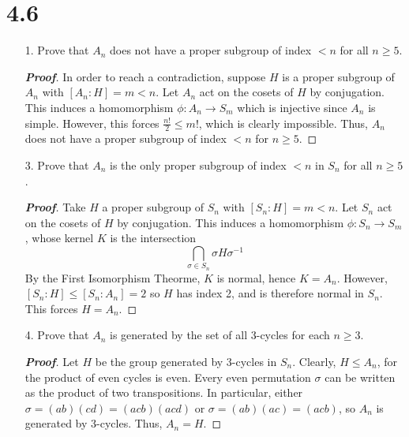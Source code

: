 \documentclass[12pt,leqno]{book}
\theoremstyle{definition}
\newenvironment{Proof}{\begin{proof}[\textnormal{\textbf{Proof}}]}{\end{proof}}
\begin{document}
\section*{4.6}
\begin{enumerate}
 \item [1.] Prove that $A_n$ does not have a proper subgroup of index $<n$ for all $n\geq5$.

\begin{Proof}
 In order to reach a contradiction, suppose $H$ is a proper subgroup of $A_n$ with $[A_n:H]=m<n$. Let $A_n$ act on the cosets of $H$ by conjugation. This induces a homomorphism $\phi:A_n\to S_m$ which is injective since $A_n$ is simple. However, this forces $\frac{n!}{2}\leq m!$, which is clearly impossible. Thus, $A_n$ does not have a proper subgroup of index $<n$ for $n\geq5$.
\end{Proof}

 \item [3.] Prove that $A_n$ is the only proper subgroup of index $<n$ in $S_n$ for all $n\geq5$.

\begin{Proof}
 Take $H$ a proper subgroup of $S_n$ with $[S_n:H]=m<n$. Let $S_n$ act on the cosets of $H$ by conjugation. This induces a homomorphism $\phi:S_n\to S_m$, whose kernel $K$ is the intersection \[\bigcap_{\sigma\in S_n}\sigma H\sigma^{-1}\] By the First Isomorphism Theorme, $K$ is normal, hence $K=A_n$. However, $[S_n:H]\leq[S_n:A_n]=2$ so $H$ has index 2, and is therefore normal in $S_n$. This forces $H=A_n$.
\end{Proof}

 \item [4.] Prove that $A_n$ is generated by the set of all 3-cycles for each $n\geq3$.

\begin{Proof}
 Let $H$ be the group generated by 3-cycles in $S_n$. Clearly, $H\leq A_n$, for the product of even cycles is even. Every even permutation $\sigma$ can be written as the product of two transpositions. In particular, either $\sigma=(ab)(cd)=(acb)(acd)$ or $\sigma=(ab)(ac)=(acb)$, so $A_n$ is generated by 3-cycles. Thus, $A_n=H$. 
\end{Proof}

\end{enumerate}
\end{document}
